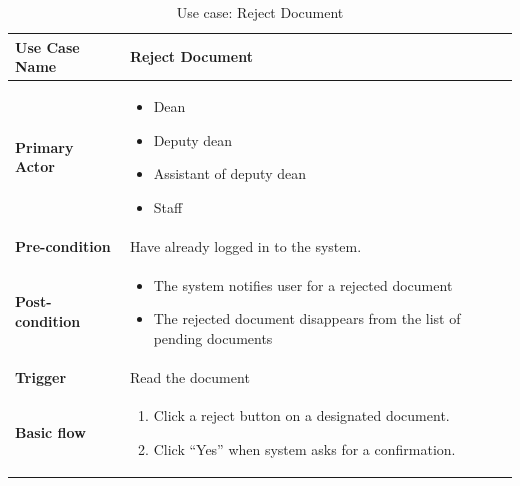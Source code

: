 \newcommand{\alreadylogin}{Have already logged in to the system}
\newcommand{\allICPersonel}{
	\begin{itemize}
		\item Dean
		\item Deputy dean
		\item Assistant of deputy dean
		\item Staff
	\end{itemize}
}

\begin{table}
	\caption{Use case: Reject Document}
	
	\begin{tabular}{|l|L{9cm}|}
		\hline
		\textbf{Use Case Name} & Reject Document \\
		\hline
		
		\textbf{Primary Actor} & \allICPersonel \\
		\textbf{Pre-condition} & \alreadylogin. \\
		\textbf{Post-condition} & 
		\begin{itemize}
			\item The system notifies user for a rejected document
			\item The rejected document disappears from the list of pending documents
		\end{itemize} \\
		\textbf{Trigger} & Read the document \\
		\textbf{Basic flow} & 
		\begin{enumerate}
			\item Click a reject button on a designated document.
			\item Click \enquote{Yes} when system asks for a confirmation.
		\end{enumerate} \\
		\hline
	\end{tabular}
\end{table}

